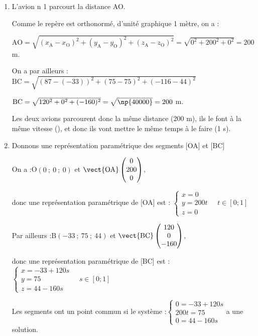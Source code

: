 \begin{enumerate}
\item L'avion n 1 parcourt la distance AO.

Comme le repère est orthonormé, d'unité graphique 1 mètre, on a :

$\mathrm{AO} = \sqrt{(x_\mathrm{A} - x_{\mathrm{O}})^2+(y_\mathrm{A} - y_{\mathrm{O}})^2+(z_\mathrm{A} - z_{\mathrm{O}})^2} = \sqrt{0^2 +200^2 + 0^2 } = 200$ m.

On a par ailleurs : \quad $\mathrm{BC} = \sqrt{(87 - (-33))^2 + (75 - 75)^2 + (-116 - 44)^2}$

$\mathrm{BC}  = \sqrt{120^2 + 0^2 + (-160)^2}= \sqrt{\np{40000}} = 200$ m.

Les deux avions parcourent donc la même distance (200 m), ils le font à la même vitesse (), et donc ils vont mettre le même temps à le faire (1 s).

\item Donnons une représentation paramétrique des segments [OA] et [BC]

On a :\quad O$(0~;~0~;~0)$ et $\vect{\mathrm{OA}} \begin{pmatrix} 0\\200\\0\end{pmatrix}$,

donc une représentation paramétrique de [OA] est  :
\quad
$\begin{cases} x = 0\\y = 200t \\z = 0\end{cases} \quad t \in [0 ; 1]$

Par ailleurs :\quad B$(-33~;~75~;~44)$ et $\vect{\mathrm{BC}} \begin{pmatrix} 120\\0\\-160\end{pmatrix}$,

donc une représentation paramétrique de [BC] est  :
\quad
$\begin{cases} x = -33 + 120s\\y = 75 \\z = 44 -160s\end{cases} \quad s \in [0 ; 1]$

Les segments ont un point commun si le système :\quad $\begin{cases}
0 = -33 + 120s\\200t = 75\\0 = 44 - 160s\end{cases}$\quad a une solution.


\end{enumerate}
